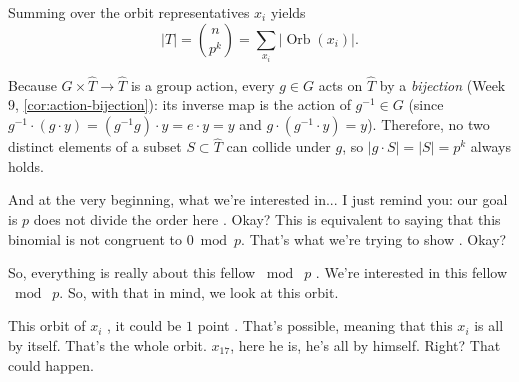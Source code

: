 \begin{proofWrapper}
\begin{content}
\begin{center}
\end{center}

Summing over the orbit representatives $x_i$ yields
\[
|T| = \binom{n}{p^k} = \sum_{x_i} |\operatorname{Orb}(x_i)|.
\]

\begin{steps}
Because $G \times \widehat{T} \to \widehat{T}$ is a group action, every $g \in G$ acts on $\widehat{T}$ by a \emph{bijection} (Week 9, \cref{cor:action-bijection}): its inverse map is the action of $g^{-1} \in G$ (since $g^{-1} \cdot (g \cdot y) = (g^{-1} g) \cdot y = e \cdot y = y$ and $g \cdot (g^{-1} \cdot y) = y$). Therefore, no two distinct elements of a subset $S \subset \widehat{T}$ can collide under $g$, so $|g \cdot S| = |S| = p^k$ always holds.
\end{steps}
\end{content}

\begin{hidden}
\end{hidden}

\begin{speech}[00:53:29 - 00:55:07]
And at the very beginning, what we're interested in... I just remind you: our goal is $p$ does not divide the order here . Okay? This is equivalent to saying that this binomial is not congruent to $0 \bmod p$. That's what we're trying to show . Okay?

So, everything is really about this fellow $\bmod\; p$ . We're interested in this fellow $\bmod\; p$. So, with that in mind, we look at this orbit.

This orbit of $x_i$ , it could be $1$ point . That's possible, meaning that this $x_i$ is all by itself. That's the whole orbit.  $x_{17}$, here he is, he's all by himself. Right? That could happen.


\end{speech}
\end{proofWrapper}
